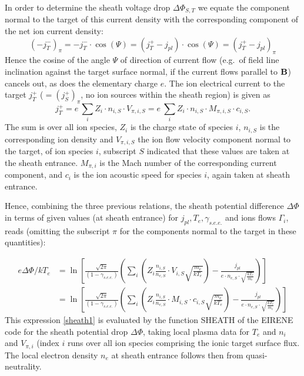 In order to determine the sheath voltage drop $\Delta\Phi_{S,T}$ we equate the
component normal to the target of this current density with the corresponding
component of the net ion current density:
\begin{displaymath}
  \left(-j^-_T\right)_{\pi} =-j^-_T \cdot \cos(\Psi) =
  (j^+_T - j_{pl}) \cdot \cos(\Psi) = \left(j^+_T - j_{pl}\right)_{\pi}
\end{displaymath}
Hence the cosine of the angle $\Psi$ of direction of current flow (e.g.\ of
field line inclination against the target surface normal, if the current flows
parallel to $\mathbf{B}$) cancels out, as does the elementary charge $e$.
The ion electrical current to the target $j^+_T$ ($ = (j^+_S)_{\pi}$, no ion
sources within the sheath region) is given as
\begin{displaymath}
  j^+_T = e \
  \sum_i Z_i \cdot n_{i,S} \cdot {{V}_{\pi,i,S}} = e \ \sum_i Z_i \cdot n_{i,S}
  \cdot M_{\pi,i,S} \cdot c_{i,S}.
\end{displaymath}
The sum is over all ion species, $Z_i$ is the charge state of species $i$,
$n_{i,S}$ is the corresponding ion density and ${{V}_{\pi,i,S}}$ the ion flow
velocity component normal to the target, of ion species $i$, subscript $S$
indicated that these values are taken at the sheath entrance.
$M_{\pi,i}$ is the Mach number of the corresponding current component, and
$c_i$ is the ion acoustic speed for species $i$, again taken at sheath
entrance.

Hence, combining the three previous relations, the sheath potential difference
$\Delta\Phi$ in terms of given values (at sheath entrance) for $ j_{pl},  T_e,
  \gamma_{s.e.e.
  }
$ and ions flows $\Gamma_i$, reads (omitting the subscript $\pi$ for the
components normal to the target in these quantities):

\begin{align}
  \label{sheath1}
  e \Delta\Phi/kT_e & =
  \ln\left[\frac{\sqrt{2\pi}}{(1-\gamma_{s.e.e.})}\left(\sum_i
    \left( Z_i \frac{n_{i,S}}{n_{e,S}}\cdot {V_{i,S}}
    \sqrt{\frac{m_e}{kT_e}}\right)-\frac{j_{pl}}{e \cdot n_{e,S} \cdot \sqrt{\frac{kT_e}{m_e}}}\right)\right] \\
                    & = \label{sheath2}
  \ln\left\lbrack\frac{\sqrt{2\pi}}{(1-\gamma_{s.e.e.})}\left(\sum_i
  \left( Z_i \frac{n_{i,S}}{n_{e,S}} \cdot M_{i,S} \cdot c_{i,S}
  \sqrt{\frac{m_e}{kT_e}}\right)-\frac{j_{pl}}{e \cdot n_{e,S} \cdot \sqrt{\frac{kT_e}{m_e}}}\right)\right\rbrack
\end{align}
This expression \cref{sheath1} is evaluated by the function SHEATH of the
EIRENE code for the sheath potential drop $\Delta\Phi$, taking local plasma
data for $T_e$ and $n_i$ and ${V_{\pi,i}}$  (index $i$ runs over all ion
species comprising the ionic target surface flux.
The local electron density $n_e$ at sheath entrance  follows then  from
quasi-neutrality.

